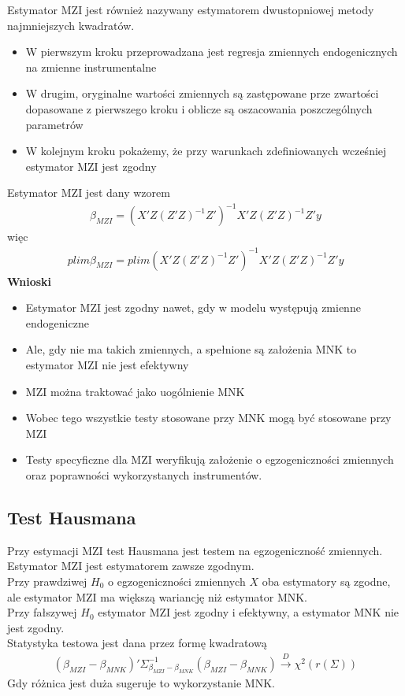 Estymator MZI jest również nazywany estymatorem dwustopniowej metody najmniejszych kwadratów.
\begin{itemize}
	\item W pierwszym kroku przeprowadzana jest regresja zmiennych endogenicznych na zmienne instrumentalne
	\item W drugim, oryginalne wartości zmiennych są zastępowane prze zwartości dopasowane z pierwszego kroku i oblicze są oszacowania poszczególnych parametrów
	\item W kolejnym kroku pokażemy, że przy warunkach zdefiniowanych wcześniej estymator MZI jest zgodny
\end{itemize}
Estymator MZI jest dany wzorem
\begin{gather*}
\beta_{MZI}
=
\left(X'Z\left(Z'Z\right)^{-1}Z'\right)^{-1}X'Z\left(Z'Z\right)^{-1}Z'y
\end{gather*}
więc
\begin{gather*}
plim\beta_{MZI}
=
plim\left(X'Z\left(Z'Z\right)^{-1}Z'\right)^{-1}X'Z\left(Z'Z\right)^{-1}Z'y
\end{gather*}
\textbf{Wnioski}\\
\begin{itemize}
	\item Estymator MZI jest zgodny nawet, gdy w modelu występują zmienne endogeniczne
	\item Ale, gdy nie ma takich zmiennych, a spełnione są założenia MNK to estymator MZI nie jest efektywny
	\item MZI można traktować jako uogólnienie MNK
	\item Wobec tego wszystkie testy stosowane przy MNK mogą być stosowane przy MZI
	\item Testy specyficzne dla MZI weryfikują założenie o egzogeniczności zmiennych oraz poprawności wykorzystanych instrumentów.
\end{itemize}

\subsection{Test Hausmana}
Przy estymacji MZI test Hausmana jest testem na egzogeniczność zmiennych. Estymator MZI jest estymatorem zawsze zgodnym.\\
Przy prawdziwej $ H_0 $ o egzogeniczności zmiennych $ X $ oba estymatory są zgodne, ale estymator MZI ma większą wariancję niż estymator MNK.\\
Przy fałszywej $ H_0 $ estymator MZI jest zgodny i efektywny, a estymator MNK nie jest zgodny.\\
Statystyka testowa jest dana przez formę kwadratową
\begin{gather*}
\left(\beta_{MZI}-\beta_{MNK}\right)'\Sigma_{\beta_{MZI}-\beta_{MNK}}^{-1}\left(\beta_{MZI}-\beta_{MNK}\right)\xrightarrow{D}\chi^2\left(r(\Sigma)\right)
\end{gather*}
Gdy różnica jest duża sugeruje to wykorzystanie MNK.


